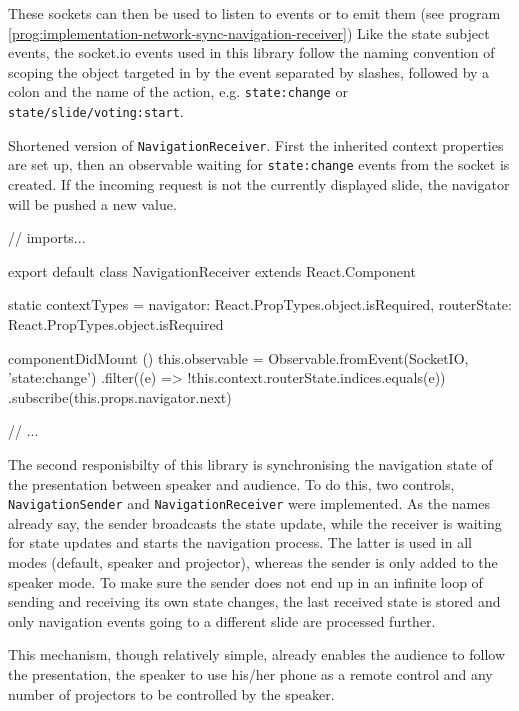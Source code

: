 These sockets can then be used to listen to events or to emit them (see program \ref{prog:implementation-network-sync-navigation-receiver}) Like the state subject events, the socket.io events used in this library follow the naming convention of scoping the object targeted in by the event separated by slashes, followed by a colon and the name of the action, e.g. \texttt{state:change} or \texttt{state/slide/voting:start}.

\begin{program}
\caption{Shortened version of \texttt{NavigationReceiver}. First the inherited context properties are set up, then an observable waiting for \texttt{state:change} events from the socket is created. If the incoming request is not the currently displayed slide, the navigator will be pushed a new value.}
\label{prog:implementation-network-sync-navigation-receiver}
\begin{JsCode}
// imports...

export default class NavigationReceiver extends React.Component {
  static contextTypes = {
    navigator:   React.PropTypes.object.isRequired,
    routerState: React.PropTypes.object.isRequired
  }

  componentDidMount () {
    this.observable = Observable.fromEvent(SocketIO, 'state:change')
      .filter((e) => !this.context.routerState.indices.equals(e))
      .subscribe(this.props.navigator.next)
  }

  // ...
}
\end{JsCode}
\end{program}
%
The second responisbilty of this library is synchronising the navigation state of the presentation between speaker and audience. To do this, two controls, \texttt{NavigationSender} and \texttt{NavigationReceiver} were implemented. As the names already say, the sender broadcasts the state update, while the receiver is waiting for state updates and starts the navigation process. The latter is used in all modes (default, speaker and projector), whereas the sender is only added to the speaker mode. To make sure the sender does not end up in an infinite loop of sending and receiving its own state changes, the last received state is stored and only navigation events going to a different slide are processed further.

This mechanism, though relatively simple, already enables the audience to follow the presentation, the speaker to use his/her phone as a remote control and any number of projectors to be controlled by the speaker.

